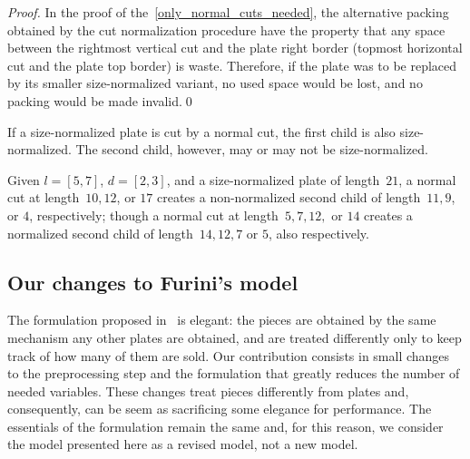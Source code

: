 \documentclass[runningheads]{llncs}
\begin{document}
\begin{proof}
In the proof of the~\autoref{only_normal_cuts_needed}, the alternative packing obtained by the cut normalization procedure have the property that any space between the rightmost vertical cut and the plate right border (topmost horizontal cut and the plate top border) is waste. Therefore, if the plate was to be replaced by its smaller size-normalized variant, no used space would be lost, and no packing would be made invalid.\qed
\end{proof}

\begin{remark}
If a size-normalized plate is cut by a normal cut, the first child is also size-normalized. The second child, however, may or may not be size-normalized.
\end{remark}


\begin{example}
Given \(l = [5, 7]\), \(d = [2, 3]\), and a size-normalized plate of length~\(21\), a normal cut at length~\(10, 12\), or \(17\) creates a non-normalized second child of length~\(11, 9\), or \(4\), respectively; though a normal cut at length~\(5, 7, 12,\) or \(14\) creates a normalized second child of length~\(14, 12, 7\) or \(5\), also respectively.
\end{example}

\subsection{Our changes to Furini's model}

% 

The formulation proposed in~\cite{furini:2016} is elegant: the pieces are obtained by the same mechanism any other plates are obtained, and are treated differently only to keep track of how many of them are sold.
Our contribution consists in small changes to the preprocessing step and the formulation that greatly reduces the number of needed variables.
These changes treat pieces differently from plates and, consequently, can be seem as sacrificing some elegance for performance.
The essentials of the formulation remain the same and, for this reason, we consider the model presented here as a revised model, not a new model.
\end{document}
